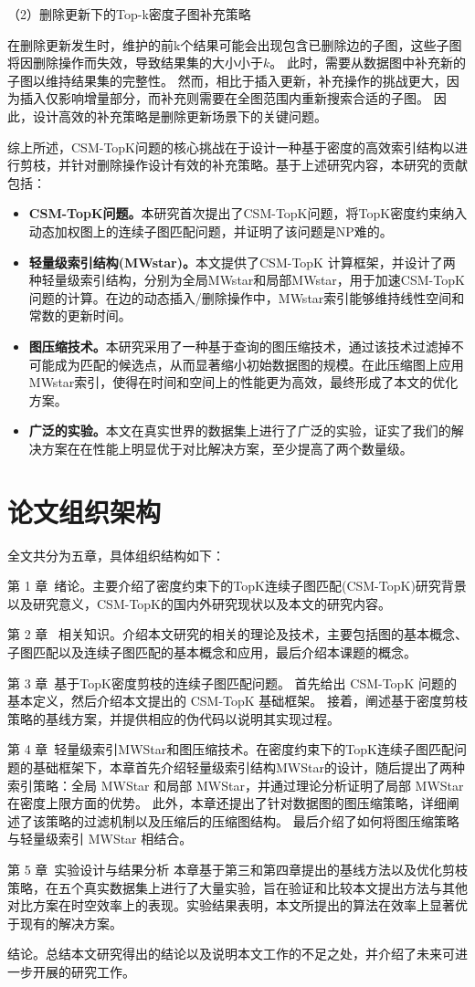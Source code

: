 （2）删除更新下的Top-k密度子图补充策略

   在删除更新发生时，维护的前k个结果可能会出现包含已删除边的子图，这些子图将因删除操作而失效，导致结果集的大小小于$k$。
   此时，需要从数据图中补充新的子图以维持结果集的完整性。
   然而，相比于插入更新，补充操作的挑战更大，因为插入仅影响增量部分，而补充则需要在全图范围内重新搜索合适的子图。
   因此，设计高效的补充策略是删除更新场景下的关键问题。

   综上所述，CSM-TopK问题的核心挑战在于设计一种基于密度的高效索引结构以进行剪枝，并针对删除操作设计有效的补充策略。基于上述研究内容，本研究的贡献包括：
\begin{itemize}[label={\textbullet}]
    \item \textbf{CSM-TopK问题。}本研究首次提出了CSM-TopK问题，将TopK密度约束纳入动态加权图上的连续子图匹配问题，并证明了该问题是NP难的。
    \item \textbf{轻量级索引结构(MWstar)。}本文提供了CSM-TopK 计算框架，并设计了两种轻量级索引结构，分别为全局MWstar和局部MWstar，用于加速CSM-TopK问题的计算。在边的动态插入/删除操作中，MWstar索引能够维持线性空间和常数的更新时间。
    \item \textbf{图压缩技术。}本研究采用了一种基于查询的图压缩技术，通过该技术过滤掉不可能成为匹配的候选点，从而显著缩小初始数据图的规模。在此压缩图上应用 MWstar索引，使得在时间和空间上的性能更为高效，最终形成了本文的优化方案。
    \item \textbf{广泛的实验。}本文在真实世界的数据集上进行了广泛的实验，证实了我们的解决方案在在性能上明显优于对比解决方案，至少提高了两个数量级。
  \end{itemize}
\section{论文组织架构}
全文共分为五章，具体组织结构如下：

第 1 章\ 绪论。主要介绍了密度约束下的TopK连续子图匹配(CSM-TopK)研究背景以及研究意义，CSM-TopK的国内外研究现状以及本文的研究内容。

第 2 章 \ 相关知识。介绍本文研究的相关的理论及技术，主要包括图的基本概念、子图匹配以及连续子图匹配的基本概念和应用，最后介绍本课题的概念。

第 3 章\ 基于TopK密度剪枝的连续子图匹配问题。
首先给出 CSM-TopK 问题的基本定义，然后介绍本文提出的 CSM-TopK 基础框架。
接着，阐述基于密度剪枝策略的基线方案，并提供相应的伪代码以说明其实现过程。

第 4 章\ 轻量级索引MWStar和图压缩技术。在密度约束下的TopK连续子图匹配问题的基础框架下，本章首先介绍轻量级索引结构MWStar的设计，随后提出了两种索引策略：全局 MWStar 和局部 MWStar，并通过理论分析证明了局部 MWStar 在密度上限方面的优势。
此外，本章还提出了针对数据图的图压缩策略，详细阐述了该策略的过滤机制以及压缩后的压缩图结构。
最后介绍了如何将图压缩策略与轻量级索引 MWStar 相结合。

第 5 章\ 实验设计与结果分析
本章基于第三和第四章提出的基线方法以及优化剪枝策略，在五个真实数据集上进行了大量实验，旨在验证和比较本文提出方法与其他对比方案在时空效率上的表现。实验结果表明，本文所提出的算法在效率上显著优于现有的解决方案。

结论。总结本文研究得出的结论以及说明本文工作的不足之处，并介绍了未来可进一步开展的研究工作。
